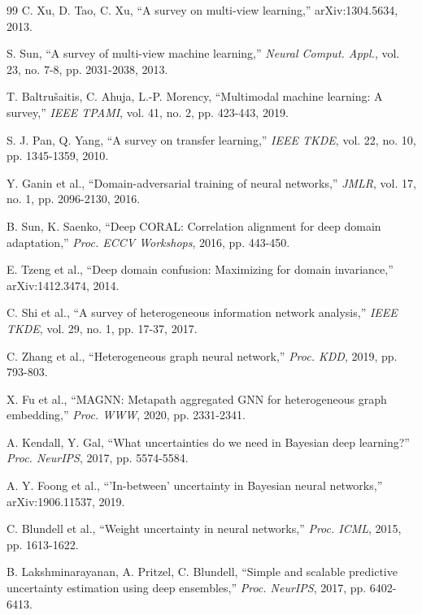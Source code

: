 \documentclass[review,12pt]{elsarticle}
\begin{document}
\begin{thebibliography}{99}
C. Xu, D. Tao, C. Xu, ``A survey on multi-view learning,'' arXiv:1304.5634, 2013.

S. Sun, ``A survey of multi-view machine learning,'' \textit{Neural Comput. Appl.}, vol. 23, no. 7-8, pp. 2031-2038, 2013.

T. Baltrušaitis, C. Ahuja, L.-P. Morency, ``Multimodal machine learning: A survey,'' \textit{IEEE TPAMI}, vol. 41, no. 2, pp. 423-443, 2019.

S. J. Pan, Q. Yang, ``A survey on transfer learning,'' \textit{IEEE TKDE}, vol. 22, no. 10, pp. 1345-1359, 2010.

Y. Ganin et al., ``Domain-adversarial training of neural networks,'' \textit{JMLR}, vol. 17, no. 1, pp. 2096-2130, 2016.

B. Sun, K. Saenko, ``Deep CORAL: Correlation alignment for deep domain adaptation,'' \textit{Proc. ECCV Workshops}, 2016, pp. 443-450.

E. Tzeng et al., ``Deep domain confusion: Maximizing for domain invariance,'' arXiv:1412.3474, 2014.

C. Shi et al., ``A survey of heterogeneous information network analysis,'' \textit{IEEE TKDE}, vol. 29, no. 1, pp. 17-37, 2017.

C. Zhang et al., ``Heterogeneous graph neural network,'' \textit{Proc. KDD}, 2019, pp. 793-803.

X. Fu et al., ``MAGNN: Metapath aggregated GNN for heterogeneous graph embedding,'' \textit{Proc. WWW}, 2020, pp. 2331-2341.

A. Kendall, Y. Gal, ``What uncertainties do we need in Bayesian deep learning?'' \textit{Proc. NeurIPS}, 2017, pp. 5574-5584.

A. Y. Foong et al., ``'In-between' uncertainty in Bayesian neural networks,'' arXiv:1906.11537, 2019.

C. Blundell et al., ``Weight uncertainty in neural networks,'' \textit{Proc. ICML}, 2015, pp. 1613-1622.

B. Lakshminarayanan, A. Pritzel, C. Blundell, ``Simple and scalable predictive uncertainty estimation using deep ensembles,'' \textit{Proc. NeurIPS}, 2017, pp. 6402-6413.


\end{thebibliography}
\end{document}
